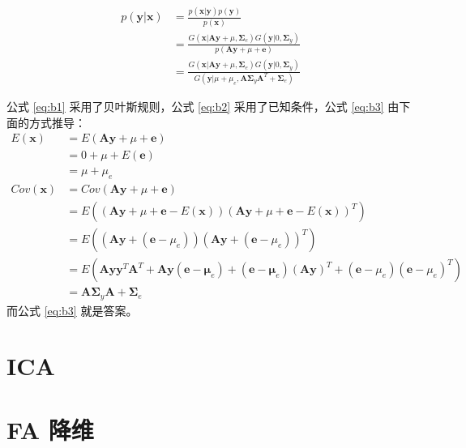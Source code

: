     \begin{align}
        p(\mathbf{y}|\mathbf{x}) &= \frac{p(\mathbf{x}|\mathbf{y})p(\mathbf{y})}{p(\mathbf{x})} \label{eq:b1} \\
        &= \frac{G(\mathbf{x}|\mathbf{A}\mathbf{y}+\mu,\mathbf{\Sigma}_e)G(\mathbf{y}|0,\mathbf{\Sigma}_y)}{p(\mathbf{A}\mathbf{y}+\mu+\mathbf{e})} \label{eq:b2} \\
        &= \frac{G(\mathbf{x}|\mathbf{A}\mathbf{y}+\mu,\mathbf{\Sigma}_e)G(\mathbf{y}|0,\mathbf{\Sigma}_y)}{G(\mathbf{y}|\mu+\mu_e,\mathbf{A}\mathbf{\Sigma}_y\mathbf{A}^T+\mathbf{\Sigma}_e)} \label{eq:b3}
    \end{align}

    公式 \eqref{eq:b1} 采用了贝叶斯规则，公式 \eqref{eq:b2} 采用了已知条件，公式 \eqref{eq:b3} 由下面的方式推导：
    \begin{align*}
        E(\mathbf{x}) &= E(\mathbf{A}\mathbf{y}+\mu+\mathbf{e}) \\
        &= 0 + \mu + E(\mathbf{e}) \\
        &= \mu + \mu_e\\
        Cov(\mathbf{x}) &= Cov(\mathbf{A}\mathbf{y}+\mu+\mathbf{e}) 
        \\
        &= E((\mathbf{A}\mathbf{y}+\mu+\mathbf{e}-E(\mathbf{x}))(\mathbf{A}\mathbf{y}+\mu+\mathbf{e}-E(\mathbf{x}))^T) \\
        &= E((\mathbf{A}\mathbf{y} + (\mathbf{e}-\mu_e))(\mathbf{A}\mathbf{y} + (\mathbf{e}-\mu_e))^T)\\
        &= E(\mathbf{A}\mathbf{y}\mathbf{y}^T\mathbf{A}^T+\mathbf{A}\mathbf{y}(\mathbf{e}-\mathbf{\mu}_e)+(\mathbf{e}-\mathbf{\mu}_e)(\mathbf{Ay})^T+(\mathbf{e}-\mu_e)(\mathbf{e}-\mu_e)^T)\\
        &= \mathbf{A}\mathbf{\Sigma}_y\mathbf{A} + \mathbf{\Sigma}_e
    \end{align*}
    而公式 \eqref{eq:b3} 就是答案。

    \section{ICA}

    
    \section{FA 降维}

    

